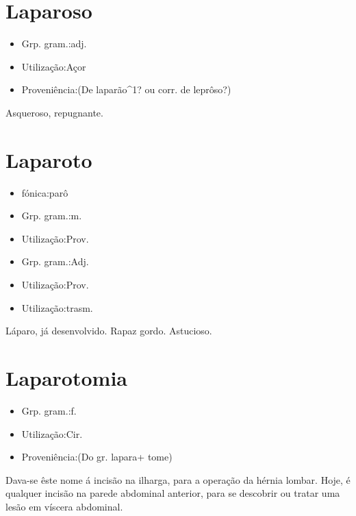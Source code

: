 \section{Laparoso}
\begin{itemize}
\item {Grp. gram.:adj.}
\end{itemize}
\begin{itemize}
\item {Utilização:Açor}
\end{itemize}
\begin{itemize}
\item {Proveniência:(De \textunderscore laparão\textunderscore ^1? ou corr. de \textunderscore leprôso\textunderscore ?)}
\end{itemize}
Asqueroso, repugnante.
\section{Laparoto}
\begin{itemize}
\item {fónica:parô}
\end{itemize}
\begin{itemize}
\item {Grp. gram.:m.}
\end{itemize}
\begin{itemize}
\item {Utilização:Prov.}
\end{itemize}
\begin{itemize}
\item {Grp. gram.:Adj.}
\end{itemize}
\begin{itemize}
\item {Utilização:Prov.}
\end{itemize}
\begin{itemize}
\item {Utilização:trasm.}
\end{itemize}
Láparo, já desenvolvido.
Rapaz gordo.
Astucioso.
\section{Laparotomia}
\begin{itemize}
\item {Grp. gram.:f.}
\end{itemize}
\begin{itemize}
\item {Utilização:Cir.}
\end{itemize}
\begin{itemize}
\item {Proveniência:(Do gr. \textunderscore lapara\textunderscore  + \textunderscore tome\textunderscore )}
\end{itemize}
Dava-se êste nome á incisão na ilharga, para a operação da hérnia lombar.
Hoje, é qualquer incisão na parede abdominal anterior, para se descobrir ou tratar uma lesão em víscera abdominal.
